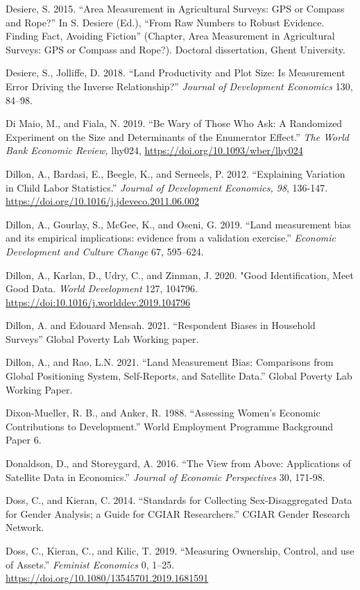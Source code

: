 \documentclass[
]{book}
\begin{document}
Desiere, S. 2015. ``Area Measurement in Agricultural Surveys: GPS or Compass and Rope?'' In S. Desiere (Ed.), ``From Raw Numbers to Robust Evidence. Finding Fact, Avoiding Fiction'' (Chapter, Area Measurement in Agricultural Surveys: GPS or Compass and Rope?). Doctoral dissertation, Ghent University.

Desiere, S., Jolliffe, D. 2018. ``Land Productivity and Plot Size: Is Measurement Error Driving the Inverse Relationship?'' \emph{Journal of Development Economics} 130, 84--98.

Di Maio, M., and Fiala, N. 2019. ``Be Wary of Those Who Ask: A Randomized Experiment on the Size and Determinants of the Enumerator Effect.'' \emph{The World Bank Economic Review,} lhy024, \url{https://doi.org/10.1093/wber/lhy024}

Dillon, A., Bardasi, E., Beegle, K., and Serneels, P. 2012. ``Explaining Variation in Child Labor Statistics.'' \emph{Journal of Development Economics, 98}, 136-147. \url{https://doi.org/10.1016/j.jdeveco.2011.06.002}

Dillon, A., Gourlay, S., McGee, K., and Oseni, G. 2019. ``Land measurement bias and its empirical implications: evidence from a validation exercise.'' \emph{Economic Development and Culture Change} 67, 595--624.

Dillon, A., Karlan, D., Udry, C., and Zinman, J. 2020. "Good Identification, Meet Good Data. \emph{World Development} 127, 104796. \url{https://doi:10.1016/j.worlddev.2019.104796}

Dillon, A. and Edouard Mensah. 2021. ``Respondent Biases in Household Surveys'' Global Poverty Lab Working paper.

Dillon, A., and Rao, L.N. 2021. ``Land Measurement Bias: Comparisons from Global Positioning System, Self-Reports, and Satellite Data.'' Global Poverty Lab Working Paper.

Dixon-Mueller, R. B., and Anker, R. 1988. ``Assessing Women's Economic Contributions to Development.'' World Employment Programme Background Paper 6.

Donaldson, D., and Storeygard, A. 2016. ``The View from Above: Applications of Satellite Data in Economics.'' \emph{Journal of Economic Perspectives} 30, 171-98.

Doss, C., and Kieran, C. 2014. ``Standards for Collecting Sex-Disaggregated Data for Gender Analysis; a Guide for CGIAR Researchers.'' CGIAR Gender Research Network.

Doss, C., Kieran, C., and Kilic, T. 2019. ``Measuring Ownership, Control, and use of Assets.'' \emph{Feminist Economics} 0, 1--25. \url{https://doi.org/10.1080/13545701.2019.1681591}
\end{document}

